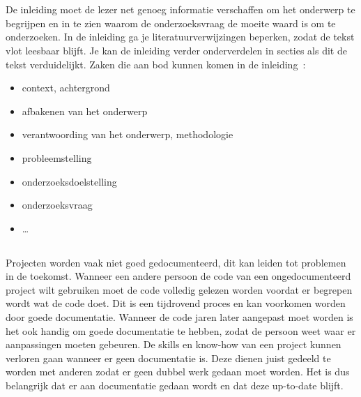 
\chapter{}%
\label{ch:inleiding}

De inleiding moet de lezer net genoeg informatie verschaffen om het onderwerp te begrijpen en in te zien waarom de onderzoeksvraag 
de moeite waard is om te onderzoeken. In de inleiding ga je literatuurverwijzingen beperken, zodat de tekst vlot leesbaar blijft. 
Je kan de inleiding verder onderverdelen in secties als dit de tekst verduidelijkt. 
Zaken die aan bod kunnen komen in de inleiding~\autocite{Pollefliet2011}:

\begin{itemize}
  \item context, achtergrond
  \item afbakenen van het onderwerp
  \item verantwoording van het onderwerp, methodologie
  \item probleemstelling
  \item onderzoeksdoelstelling
  \item onderzoeksvraag
  \item \ldots
\end{itemize}

\section{}%
\label{sec:probleemstelling}

Projecten worden vaak niet goed gedocumenteerd, dit kan leiden tot problemen in de toekomst. Wanneer een andere persoon de code van een ongedocumenteerd project wilt gebruiken moet de code volledig gelezen worden voordat er begrepen wordt wat de code doet. 
Dit is een tijdrovend proces en kan voorkomen worden door goede documentatie.
Wanneer de code jaren later aangepast moet worden is het ook handig om goede documentatie te hebben, zodat de persoon weet waar er aanpassingen moeten gebeuren.
De skills en know-how van een project kunnen verloren gaan wanneer er geen documentatie is.
Deze dienen juist gedeeld te worden met anderen zodat er geen dubbel werk gedaan moet worden.
Het is dus belangrijk dat er aan documentatie gedaan wordt en dat deze up-to-date blijft.

